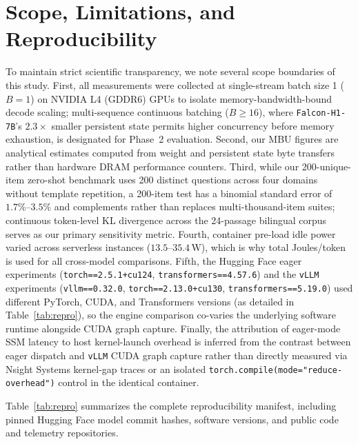 \documentclass[10pt,a4paper]{article}
\begin{document}
\section{Scope, Limitations, and Reproducibility}
To maintain strict scientific transparency, we note several scope boundaries of this study. First, all measurements were collected at single-stream batch size 1 ($B=1$) on NVIDIA L4 (GDDR6) GPUs to isolate memory-bandwidth-bound decode scaling; multi-sequence continuous batching ($B \ge 16$), where \texttt{Falcon-H1-7B}'s $2.3\times$ smaller persistent state permits higher concurrency before memory exhaustion, is designated for Phase~2 evaluation. Second, our MBU figures are analytical estimates computed from weight and persistent state byte transfers rather than hardware DRAM performance counters. Third, while our 200-unique-item zero-shot benchmark uses 200 distinct questions across four domains without template repetition, a 200-item test has a binomial standard error of $1.7\%\text{--}3.5\%$ and complements rather than replaces multi-thousand-item suites; continuous token-level KL divergence across the 24-passage bilingual corpus serves as our primary sensitivity metric. Fourth, container pre-load idle power varied across serverless instances ($13.5\text{--}35.4\,\text{W}$), which is why total Joules/token is used for all cross-model comparisons. Fifth, the Hugging Face eager experiments (\texttt{torch==2.5.1+cu124}, \texttt{transformers==4.57.6}) and the \texttt{vLLM} experiments (\texttt{vllm==0.32.0}, \texttt{torch==2.13.0+cu130}, \texttt{transformers==5.19.0}) used different PyTorch, CUDA, and Transformers versions (as detailed in Table~\ref{tab:repro}), so the engine comparison co-varies the underlying software runtime alongside CUDA graph capture. Finally, the attribution of eager-mode SSM latency to host kernel-launch overhead is inferred from the contrast between eager dispatch and \texttt{vLLM} CUDA graph capture rather than directly measured via Nsight Systems kernel-gap traces or an isolated \texttt{torch.compile(mode="reduce-overhead")} control in the identical container.

Table~\ref{tab:repro} summarizes the complete reproducibility manifest, including pinned Hugging Face model commit hashes, software versions, and public code and telemetry repositories.
\end{document}
